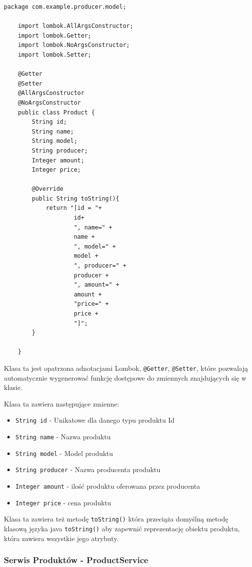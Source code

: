 \begin{lstlisting}[caption=Klasa reprezentująca produkt, label=produktmodel]
    package com.example.producer.model;
    
    import lombok.AllArgsConstructor;
    import lombok.Getter;
    import lombok.NoArgsConstructor;
    import lombok.Setter;
    
    @Getter
    @Setter
    @AllArgsConstructor
    @NoArgsConstructor
    public class Product {
        String id;
        String name;
        String model;
        String producer;
        Integer amount;
        Integer price;
    
        @Override
        public String toString(){
            return "[id = "+
                    id+
                    ", name=" +
                    name +
                    ", model=" +
                    model +
                    ", producer=" +
                    producer +
                    ", amount=" +
                    amount +
                    "price=" +
                    price +
                    "]";
        }
    
    }
\end{lstlisting}

Klasa ta jest opatrzona adnotacjami Lombok, \verb|@Getter|, \verb|@Setter|, które pozwalają automatycznie wygenerować funkcję dostępowe do zmiennych znajdujących się w klasie.

Klasa ta zawiera następujące zmienne:
\begin{itemize}
    \item \verb|String id| - Unikatowe dla danego typu produktu Id
    \item \verb|String name| - Nazwa produktu
    \item \verb|String model| - Model produktu
    \item \verb|String producer| - Nazwa producenta produktu
    \item \verb|Integer amount| - ilość produktu oferowana przez producenta
    \item \verb|Integer price| - cena produktu
\end{itemize}

Klasa ta zawiera też metodę \verb|toString()| która przeciąża domyślną metodę klasową języka java \verb|toString()| aby zapewnić reprezentację obiektu produktu, która zawiera wszystkie jego atrybuty.

\subsubsection{Serwis Produktów - ProductService}

